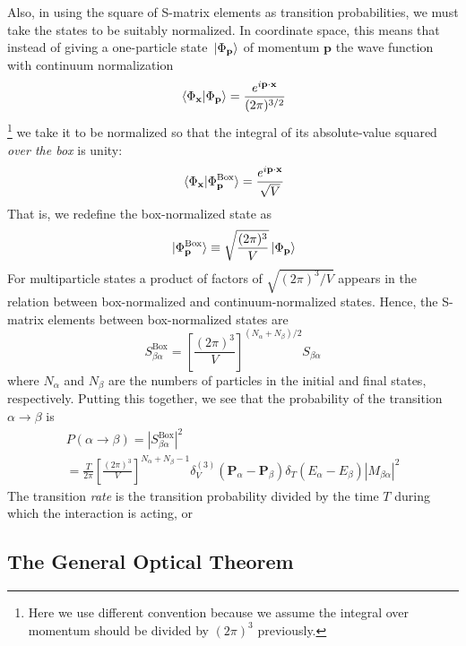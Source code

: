 \documentclass[12pt]{article}
\numberwithin{equation}{section}
\begin{document}
Also, in using the square of S-matrix elements as transition probabilities, we must take the states to be suitably normalized.
In coordinate space, this means that instead of giving a one-particle state $\ket*{\Phi_{\mathbf{p}}}$ of momentum $\mathbf{p}$ the wave function with continuum normalization
\[\braket*{\Phi_{\mathbf{x}}}{\Phi_{\mathbf{p}}} = \frac{e^{i\mathbf{p}\cdot\mathbf{x}}}{(2\pi)^{3/2}}\]\footnote{Here we use different convention because we assume the integral over momentum should be divided by $(2\pi)^3$ previously.}
we take it to be normalized so that the integral of its absolute-value squared \textit{over the box} is unity:
\begin{equation}
    \braket*{\Phi_{\mathbf{x}}}{\Phi_{\mathbf{p}}^{\text{Box}}} = \frac{e^{i\mathbf{p}\cdot\mathbf{x}}}{\sqrt{V}}
\end{equation}
That is, we redefine the box-normalized state as 
\begin{equation}
    \ket*{\Phi_{\mathbf{p}}^{\text{Box}}} \equiv \sqrt{\frac{(2\pi)^3}{V}}\ket*{\Phi_{\mathbf{p}}}
\end{equation}
For multiparticle states a product of factors of $\sqrt{(2\pi)^3/V}$ appears in the relation between box-normalized and continuum-normalized states.
Hence, the S-matrix elements between box-normalized states are 
\begin{equation}
    S_{\beta\alpha}^{\text{Box}} = \left[\frac{(2\pi)^3}{V}\right]^{(N_{\alpha}+N_{\beta})/2}S_{\beta\alpha}
\end{equation}
where $N_{\alpha}$ and $N_{\beta}$ are the numbers of particles in the initial and final states, respectively.
Putting this together, we see that the probability of the transition $\alpha\rightarrow\beta$ is
\begin{equation}
    \begin{split}
        P(\alpha\rightarrow\beta) = \left|S_{\beta\alpha}^{\text{Box}}\right|^2\\
        =\frac{T}{2\pi}\left[\frac{(2\pi)^3}{V}\right]^{N_{\alpha}+N_{\beta}-1}\delta^{(3)}_{V}(\mathbf{P}_{\alpha}-\mathbf{P}_{\beta})\delta_{T}(E_{\alpha}-E_{\beta})\left|M_{\beta\alpha}\right|^2
    \end{split}
\end{equation}
The transition \textit{rate} is the transition probability divided by the time $T$ during which the interaction is acting, or
\[\]
\subsection{The General Optical Theorem}
\end{document}
